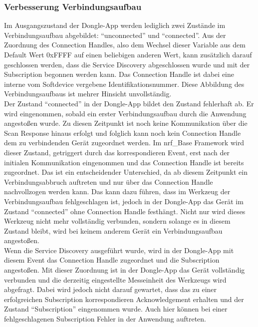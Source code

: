 \subsubsection{Verbesserung Verbindungsaufbau}
Im Ausgangszustand der Dongle-App werden lediglich zwei Zustände im Verbindungsaufbau abgebildet: ``unconnected'' und ``connected''. Aus der Zuordnung des Connection Handles, also dem Wechsel dieser Variable aus dem Default Wert 0xFFFF auf einen beliebigen anderen Wert, kann zusätzlich darauf geschlossen werden, dass die Service Discovery abgeschlossen wurde und mit der Subscription begonnen werden kann. Das Connection Handle ist dabei eine interne vom Softdevice vergebene Identifikationsnummer. Diese Abbildung des Verbindungsaufbaus ist mehrer Hinsicht unvollständig.\\
Der Zustand ``connected'' in der Dongle-App bildet den Zustand fehlerhaft ab. Er wird eingenommen, sobald ein erster Verbindungsaufbau durch die Anwendung angestoßen wurde. Zu diesen Zeitpunkt ist noch keine Kommunikation über die Scan Response hinaus erfolgt und folglich kann noch kein Connection Handle dem zu verbindenden Gerät zugeordnet werden. Im nrf\_Base Framework wird dieser Zustand, getriggert durch das korrespondieren Event, erst nach der initialen Kommunikation eingenommen und das Connection Handle ist bereits zugeordnet. Das ist ein entscheidender Unterschied, da ab diesem Zeitpunkt ein Verbindungsabbruch auftreten und nur über das Connection Handle nachvollzogen werden kann. Das kann dazu führen, dass im Werkzeug der Verbindungsaufbau fehlgeschlagen ist, jedoch in der Dongle-App das Gerät im Zustand ``connected'' ohne Connection Handle festhängt. Nicht nur wird dieses Werkzeug nicht mehr vollständig verbunden, sondern solange es in diesem Zustand bleibt, wird bei keinem anderem Gerät ein Verbindungsaufbau angestoßen.\\
Wenn die Service Discovery ausgeführt wurde, wird in der Dongle-App mit diesem Event das Connection Handle zugeordnet und die Subscription angestoßen. Mit dieser Zuordnung ist in der Dongle-App das Gerät vollständig verbunden und die derzeitig eingestellte Messeinheit des Werkzeugs wird abgefragt. Dabei wird jedoch nicht darauf gewartet, dass das zu einer erfolgreichen Subscription korrespondieren Acknowledgement erhalten und der Zustand ``Subscription'' eingenommen wurde. Auch hier können bei einer fehlgeschlagenen Subscription Fehler in der Anwendung auftreten.\\
